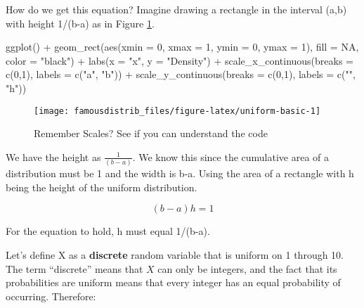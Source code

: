 \documentclass[
]{article}
\newenvironment{Shaded}{\begin{snugshade}}{\end{snugshade}}
\newcommand{\AttributeTok}[1]{\textcolor[rgb]{0.77,0.63,0.00}{#1}}
\newcommand{\ConstantTok}[1]{\textcolor[rgb]{0.00,0.00,0.00}{#1}}
\newcommand{\DecValTok}[1]{\textcolor[rgb]{0.00,0.00,0.81}{#1}}
\newcommand{\FunctionTok}[1]{\textcolor[rgb]{0.00,0.00,0.00}{#1}}
\newcommand{\NormalTok}[1]{#1}
\newcommand{\SpecialCharTok}[1]{\textcolor[rgb]{0.00,0.00,0.00}{#1}}
\newcommand{\StringTok}[1]{\textcolor[rgb]{0.31,0.60,0.02}{#1}}
\begin{document}
How do we get this equation? Imagine drawing a rectangle in the interval (a,b) with height 1/(b-a) as in Figure \ref{fig:uniform-basic}.

\begin{Shaded}
\begin{Highlighting}[]
\FunctionTok{ggplot}\NormalTok{() }\SpecialCharTok{+}
  \FunctionTok{geom\_rect}\NormalTok{(}\FunctionTok{aes}\NormalTok{(}\AttributeTok{xmin =} \DecValTok{0}\NormalTok{, }\AttributeTok{xmax =} \DecValTok{1}\NormalTok{, }\AttributeTok{ymin =} \DecValTok{0}\NormalTok{, }\AttributeTok{ymax =} \DecValTok{1}\NormalTok{), }
            \AttributeTok{fill =} \ConstantTok{NA}\NormalTok{,}
            \AttributeTok{color =} \StringTok{"black"}\NormalTok{) }\SpecialCharTok{+}
  \FunctionTok{labs}\NormalTok{(}\AttributeTok{x =} \StringTok{"x"}\NormalTok{, }\AttributeTok{y =} \StringTok{"Density"}\NormalTok{) }\SpecialCharTok{+}
  \FunctionTok{scale\_x\_continuous}\NormalTok{(}\AttributeTok{breaks =} \FunctionTok{c}\NormalTok{(}\DecValTok{0}\NormalTok{,}\DecValTok{1}\NormalTok{), }\AttributeTok{labels =} \FunctionTok{c}\NormalTok{(}\StringTok{"a"}\NormalTok{, }\StringTok{"b"}\NormalTok{)) }\SpecialCharTok{+}
  \FunctionTok{scale\_y\_continuous}\NormalTok{(}\AttributeTok{breaks =} \FunctionTok{c}\NormalTok{(}\DecValTok{0}\NormalTok{,}\DecValTok{1}\NormalTok{), }\AttributeTok{labels =} \FunctionTok{c}\NormalTok{(}\StringTok{""}\NormalTok{, }\StringTok{"h"}\NormalTok{))}
\end{Highlighting}
\end{Shaded}

\begin{figure}

{\centering \texttt{[image: famousdistrib\_files/figure-latex/uniform-basic-1]} 

}

\caption{Remember Scales? See if you can understand the code}\label{fig:uniform-basic}
\end{figure}

We have the height as \(\frac{1}{(b-a)}\). We know this since the cumulative area of a distribution must be 1 and the width is b-a. Using the area of a rectangle with h being the height of the uniform distribution.

\[(b-a)h=1\]

For the equation to hold, h must equal 1/(b-a).

Let's define X as a \textbf{discrete} random variable that is uniform on 1 through 10. The term ``discrete'' means that \(X\) can only be integers, and the fact that its probabilities are uniform means that every integer has an equal probability of occurring. Therefore:
\end{document}
